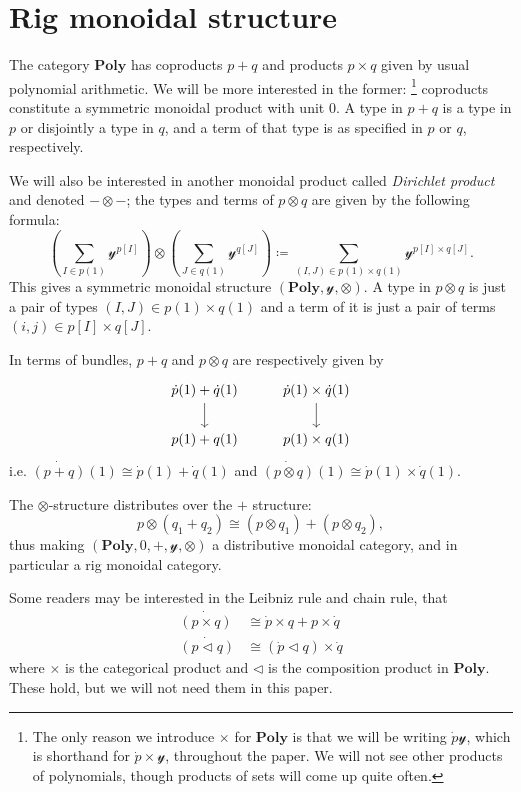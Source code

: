\documentclass[11pt, one side, article]{memoir}
\theoremstyle{definition}
\theoremstyle{plain}
\newenvironment{remark}
  {\pushQED{\qed}\renewcommand{\qedsymbol}{$\lozenge$}\remarkx}
  {\popQED\endremarkx}
\newcommand{\Cat}[1]{\mathbf{#1}}%
\newcommand{\yon}{\mathcal{y}}
\newcommand{\poly}{\Cat{Poly}}
\newcommand{\0}{\textsf{0}}
\newcommand{\1}{\tn{\textsf{1}}}
\newcommand{\tri}{\mathbin{\triangleleft}}
\begin{document}
\section{Rig monoidal structure}

The category $\poly$ has coproducts $p+q$ and products $p\times q$ given by usual polynomial arithmetic. We will be more interested in the former:%
\footnote{
The only reason we introduce $\times$ for $\poly$ is that we will be writing $\dot{p}\yon$, which is shorthand for $\dot{p}\times\yon$, throughout the paper. We will not see other products of polynomials, though products of sets will come up quite often.
}
coproducts constitute a symmetric monoidal product with unit $0$. A type in $p+q$ is a type in $p$ or disjointly a type in $q$, and a term of that type is as specified in $p$ or $q$, respectively.

We will also be interested in another monoidal product called \emph{Dirichlet product} and denoted $-\otimes-$; the types and terms of $p\otimes q$ are given by the following formula:
\begin{equation}\label{eqn.dir_formula}
  \left(\sum_{I\in p(1)}\yon^{p[I]}\right)\otimes
  \left(\sum_{J\in q(1)}\yon^{q[J]}\right)\coloneqq
  \sum_{(I,J)\in p(1)\times q(1)}\yon^{p[I]\times q[J]}.
\end{equation}
This gives a symmetric monoidal structure $(\poly,\yon,\otimes)$. A type in $p\otimes q$ is just a pair of types $(I,J)\in p(1)\times q(1)$ and a term of it is just a pair of terms $(i,j)\in p[I]\times q[J]$.

In terms of bundles, $p+q$ and $p\otimes q$ are respectively given by
\[
\begin{tikzcd}
	\dot{p}(1)+\dot{q}(1)\ar[d]&\dot{p}(1)\times\dot{q}(1)\ar[d]\\
	p(1)+q(1)&p(1)\times q(1)
\end{tikzcd}
\]
i.e. $\dot{(p+q)}(1)\cong\dot{p}(1)+\dot{q}(1)$ and $\dot{(p\otimes q)}(1)\cong\dot{p}(1)\times\dot{q}(1)$.

The $\otimes$-structure distributes over the $+$ structure:
\[
p\otimes (q_1+q_2)\cong (p\otimes q_1)+(p\otimes q_2),
\]
thus making $(\poly,0,+,\yon,\otimes)$ a distributive monoidal category, and in particular a rig monoidal category.

\begin{remark}[Leibniz and chain rules]
Some readers may be interested in the Leibniz rule and chain rule, that
\begin{align*}
	\dot{(p\times q)}&\cong\dot{p}\times q+p\times\dot{q}\\
	\dot{(p\tri q)}&\cong(\dot{p}\tri q)\times\dot{q}
\end{align*}
where $\times$ is the categorical product and $\tri$ is the composition product in $\poly$. These hold, but we will not need them in this paper.
\end{remark}
\end{document}
